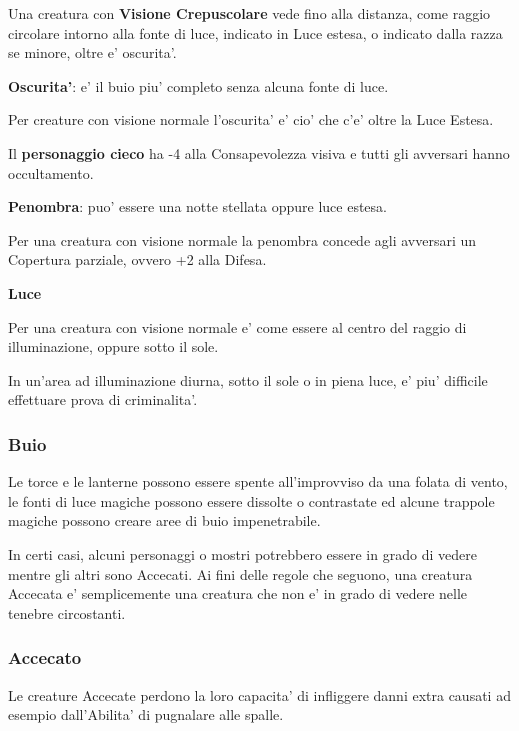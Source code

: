\documentclass[a4paper,11pt,twoside,openany]{book}
\begin{document}
{Una creatura con \textbf{Visione Crepuscolare} vede fino alla distanza, come raggio circolare intorno alla fonte di luce, indicato in Luce estesa, o indicato dalla razza se minore, oltre e' oscurita'.

\textbf{Oscurita'}: e' il buio piu' completo senza alcuna fonte di luce.

Per creature con visione normale l'oscurita' e' cio' che c'e' oltre la Luce Estesa.

Il \textbf{personaggio cieco} ha -4 alla Consapevolezza visiva e tutti gli avversari hanno occultamento.

\textbf{Penombra}: puo' essere una notte stellata oppure luce estesa.

Per una creatura con visione normale la penombra concede agli avversari
un Copertura parziale, ovvero +2 alla Difesa.

\textbf{Luce}

Per una creatura con visione normale e' come essere al centro del raggio di illuminazione, oppure sotto il sole.

In un'area ad illuminazione diurna, sotto il sole o in piena luce, e' piu' difficile effettuare prova di criminalita'.

\subsubsection{Buio}

\label{buio}

Le torce e le lanterne possono essere spente all'improvviso da una folata di vento, le fonti di luce magiche possono essere dissolte o contrastate ed alcune trappole magiche possono creare aree di buio impenetrabile.

In certi casi, alcuni personaggi o mostri potrebbero essere in grado di vedere mentre gli altri sono Accecati. Ai fini delle regole che seguono, una creatura Accecata e' semplicemente una creatura che non e' in grado di vedere nelle tenebre circostanti.

\subsubsection{Accecato}

\label{accecato}

Le creature Accecate perdono la loro capacita' di infliggere danni extra causati ad esempio dall'Abilita' di pugnalare alle spalle.

}
\end{document}
